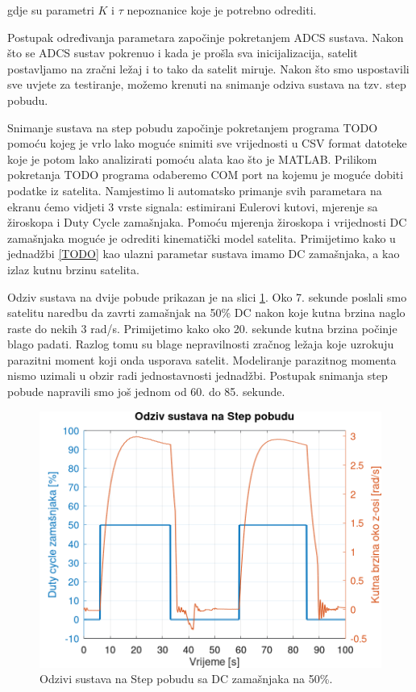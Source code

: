 \documentclass[times, utf8, diplomski, numeric]{templates/template}
\begin{document}
{{{            gdje su parametri $K$ i $\tau$ nepoznanice koje je potrebno odrediti. 
            
            Postupak određivanja parametara započinje pokretanjem ADCS sustava. Nakon što se ADCS sustav pokrenuo i kada je prošla sva inicijalizacija, satelit postavljamo na zračni ležaj i to tako da satelit miruje. Nakon što smo uspostavili sve uvjete za testiranje, možemo krenuti na snimanje odziva sustava na tzv. step pobudu.

            Snimanje sustava na step pobudu započinje pokretanjem programa TODO pomoću kojeg je vrlo lako moguće snimiti sve vrijednosti u CSV format datoteke koje je potom lako analizirati pomoću alata kao što je MATLAB. Prilikom pokretanja TODO programa odaberemo COM port na kojemu je moguće dobiti podatke iz satelita. Namjestimo li automatsko primanje svih parametara na ekranu ćemo vidjeti 3 vrste signala: estimirani Eulerovi kutovi, mjerenje sa žiroskopa i Duty Cycle zamašnjaka. Pomoću mjerenja žiroskopa i vrijednosti DC zamašnjaka moguće je odrediti kinematički model satelita. Primijetimo kako u jednadžbi \ref{TODO} kao ulazni parametar sustava imamo DC zamašnjaka, a kao izlaz kutnu brzinu satelita. 

            Odziv sustava na dvije pobude prikazan je na slici \ref{fig:step_response}. Oko 7. sekunde poslali smo satelitu naredbu da zavrti zamašnjak na 50\% DC nakon koje kutna brzina naglo raste do nekih 3 rad/s. Primijetimo kako oko 20. sekunde kutna brzina počinje blago padati. Razlog tomu su blage nepravilnosti zračnog ležaja koje uzrokuju parazitni moment koji onda usporava satelit. Modeliranje parazitnog momenta nismo uzimali u obzir radi jednostavnosti jednadžbi. Postupak snimanja step pobude napravili smo još jednom od 60. do 85. sekunde.

            \begin{figure}[htb]
            \centering
            \includegraphics[width=1.0\textwidth]{other/step_response.png}
            \caption{Odzivi sustava na Step pobudu sa DC zamašnjaka na 50\%.}
            \label{fig:step_response}
            \end{figure}

}}}
\end{document}

